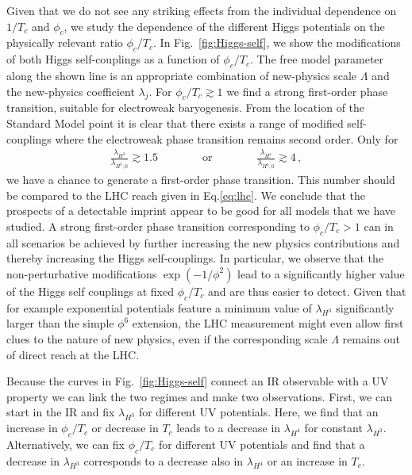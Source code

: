 \documentclass[aps,prd,11pt,tightenlines,superscriptaddress,nofootinbib,preprintnumbers,notitlepage]{revtex4-1}
\newcommand{\qqquad}{\qquad \qquad}
\begin{document}
Given that we do not see any striking effects from the
individual dependence on $1/T_c$ and $\phi_c$, we study the
dependence of the different Higgs potentials on the physically
relevant ratio $\phi_c/T_c$. In Fig.~\ref{fig:Higgs-self}, we show
the modifications of both Higgs self-couplings as a function of
$\phi_c/T_c$.  The free model parameter along the shown line is an
appropriate combination of new-physics scale $\Lambda$ and the
new-physics coefficient $\lambda_j$.  For $\phi_c/T_c \gtrsim 1$ we
find a strong first-order phase transition, suitable for electroweak
baryogenesis.
From the location of the Standard Model
point it is clear that there exists a range of modified self-couplings
where the electroweak phase transition remains second order. Only for
%
\begin{align}
\frac{\lambda_{H^3}}{\lambda_{H^3,0}} \gtrsim 1.5 
\qqquad \text{or} \qqquad 
\frac{\lambda_{H^4}}{\lambda_{H^4,0}} \gtrsim 4 \,,
\end{align}
%
we have a chance to generate a first-order phase transition.
This number should be compared to the LHC reach given in
Eq.\eqref{eq:lhc}. We conclude that the prospects of a detectable 
imprint appear to be good for all models that we have studied.
A strong first-order phase transition
corresponding to $\phi_c/T_c >1$ can in all scenarios be achieved by
further increasing the new physics contributions and thereby
increasing the Higgs self-couplings. In particular, we observe that
the non-perturbative modifications $\exp(-1/\phi^2)$ lead to a
significantly higher value of the Higgs self couplings at fixed
$\phi_c/T_c$ and are thus easier to detect. Given that for example
exponential potentials feature a minimum value of $\lambda_{H^3}$
significantly larger than the simple $\phi^6$ extension, the LHC
measurement might even allow first clues to
the nature of new physics,
even if the corresponding scale $\Lambda$ remains out of direct reach
at the LHC.\medskip

Because the curves in Fig.~\ref{fig:Higgs-self} connect an IR observable
with a UV property we can link the two regimes and make two
observations. First, we can start in the IR and fix $\lambda_{H^3}$
for different UV potentials. Here, we find that an increase in
$\phi_c/T_c$ or decrease in $T_c$ leads to a decrease in
$\lambda_{H^4}$ for constant $\lambda_{H^3}$. Alternatively, we can
fix $\phi_c/T_c$ for different UV potentials and find that a decrease
in $\lambda_{H^3}$ corresponds to a decrease also in $\lambda_{H^4}$
or an increase in $T_c$.\medskip
\end{document}
